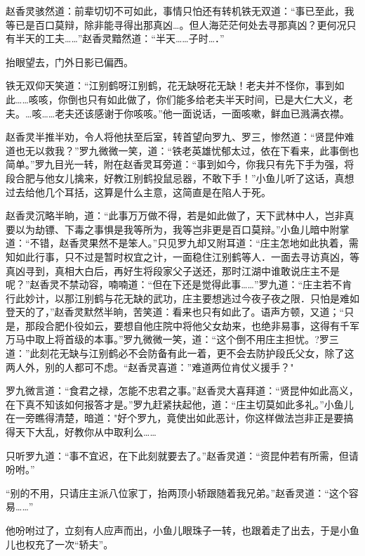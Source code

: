 \documentclass[12pt,oneside]{book}
\begin{document}
赵香灵骇然道：前辈切切不可如此，事情只怕还有转机铁无双道：``事已至此，我等已是百口莫辩，除非能寻得出那真凶\ldots。但人海茫茫何处去寻那真凶？更何况只有半天的工夫\ldots\ldots{}''赵香灵黯然道：``半天\ldots\ldots 子时\ldots．''

抬眼望去，门外日影已偏西。

铁无双仰天笑道：``江别鹤呀江别鹤，花无缺呀花无缺！老夫并不怪你，事到如此\ldots\ldots 咳咳，你倒也只有如此做了，你们能多给老夫半天时间，已是大仁大义，老夫。\ldots 咳\ldots\ldots 老夫还该感谢于你咳咳。''他一面说话，一面咳嗽，鲜血已溅满衣襟。

赵香灵半推半劝，令人将他扶至后室，转首望向罗九、罗三，惨然道：``贤昆仲难道也无以救我？''罗九微微一笑，道：``铁老英雄忧郁太过，依在下看来，此事倒也简单。''罗九目光一转，附在赵香灵耳旁道：``事到如今，你我只有先下手为强，将段合肥与他女儿擒来，好教江别鹤投鼠忌器，不敢下手！''小鱼儿听了这话，真想过去给他几个耳括，这算是什么主意，这简直是在陷人于死。

赵香灵沉略半晌，道：``此事万万做不得，若是如此做了，天下武林中人，岂非真要以为劫镖、下毒之事惧是我等所为，我等岂非更是百口莫辩。''小鱼儿暗中附掌道：``不错，赵香灵果然不是笨人。''只见罗九却又附耳道：``庄主怎地如此执着，需知如此行事，只不过是暂时权宜之计，一面稳住江别鹤等人．一面去寻访真凶，等真凶寻到，真相大白后，再好生将段家父子送还，那时江湖中谁敢说庄主不是呢？''赵香灵不禁动容，喃喃道：``但在下还是觉得此事\ldots\ldots{}''罗九道：``庄主若不肯行此妙计，以那江别鹤与花无缺的武功，庄主要想逃过今夜子夜之限．只怕是难如登天的了，''赵香灵默然半晌，苦笑道：看来也只有如此了。语声方顿，又道；``只是，那段合肥仆役如云，要想自他庄院中将他父女劫来，也绝非易事，这得有千军万马中取上将首级的本事。''罗九微微一笑，道：``这个倒不用庄主担忧。?罗三道：''此刻花无缺与江别鹤必不会防备有此一着，更不会去防护段氏父女，除了这两人外，别的人都可不虑。``赵香灵喜道：''难道两位肯仗义援手？"

罗九微言道：``食君之禄，怎能不忠君之事。''赵香灵大喜拜道：``贤昆仲如此高义，在下真不知该如何报答才是。''罗九赶紧扶起他，道：``庄主切莫如此多礼。''小鱼儿在一旁瞧得清楚，暗道："好个罗九，竟使出如此恶计，你这样做法岂非正是要搞得天下大乱，好教你从中取利么\ldots\ldots{}

只听罗九道：``事不宜迟，在下此刻就要去了。''赵香灵道：``资昆仲若有所需，但请吩咐。''

``别的不用，只请庄主派八位家丁，抬两顶小轿跟随着我兄弟。''赵香灵道：``这个容易\ldots\ldots{}''

他吩咐过了，立刻有人应声而出，小鱼儿眼珠子一转，也跟着走了出去，于是小鱼儿也权充了一次``轿夫''。
\end{document}

